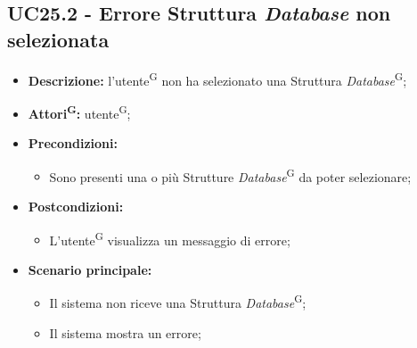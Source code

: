 \subsection{UC25.2 - Errore Struttura \textit{Database} non selezionata}
\label{sec:UC25.2}
\begin{itemize}
	\item \textbf{Descrizione:} l’utente\textsuperscript{G} non ha selezionato una Struttura \textit{Database}\textsuperscript{G};
	\item \textbf{Attori\textsuperscript{G}:} utente\textsuperscript{G};
	\item \textbf{Precondizioni:}
	\begin{itemize}
		\item Sono presenti una o più Strutture \textit{Database}\textsuperscript{G} da poter selezionare;
	\end{itemize}
	\item \textbf{Postcondizioni:}
	\begin{itemize}
		\item L’utente\textsuperscript{G} visualizza un messaggio di errore;
	\end{itemize}
	\item \textbf{Scenario principale:}
	\begin{itemize}
		\item Il sistema non riceve una Struttura \textit{Database}\textsuperscript{G};
		\item Il sistema mostra un errore;
	\end{itemize}
\end{itemize}


